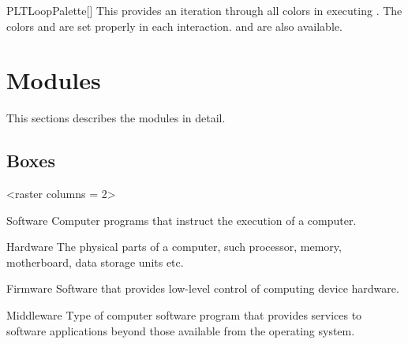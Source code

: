 \documentclass[a4paper, 11pt]{article}
\begin{document}
\begin{macro}{PLTLoopPalette}[]
    This provides an iteration through all colors in  executing . The colors  and  are set properly in each interaction.  and  are also available.
\end{macro}

\begin{tcblisting}{}
\end{tcblisting}

\section{Modules}

This sections describes the modules in detail.

\subsection{Boxes}\label{sec:boxes}

\begin{tcblisting}{}
    \begin{PLTBoxItemize}
        <raster columns = 2>
        \item[Software] Computer programs that instruct the execution of a computer.
        \item[Hardware] The physical parts of a computer, such processor, memory, motherboard, data storage units etc.
        \item[Firmware] Software that provides low-level control of computing device hardware.
        \item[Middleware] Type of computer software program that provides services to software applications beyond those available from the operating system.
    \end{PLTBoxItemize}
\end{tcblisting}
\end{document}
